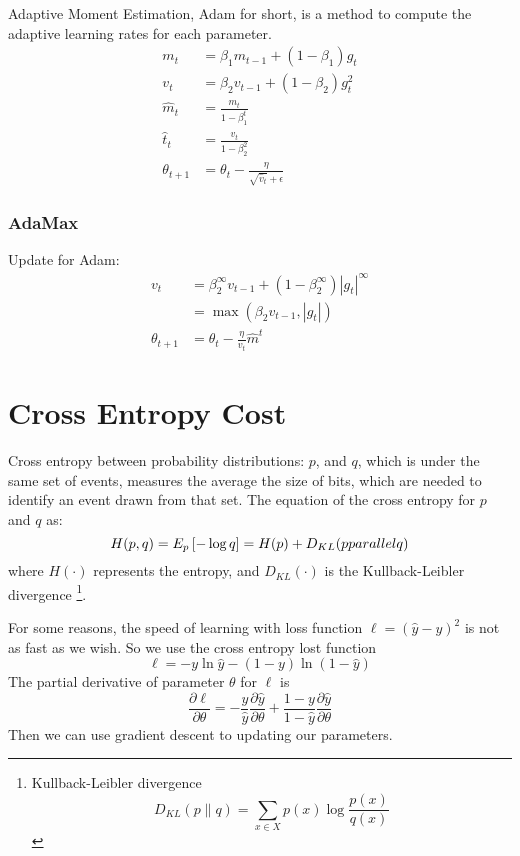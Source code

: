 \documentclass{article}
\begin{document}
Adaptive Moment Estimation, Adam for short, is a method to compute the adaptive learning rates for each parameter.
\begin{align*}
m_t &= \beta_1m_{t-1}+(1-\beta_1)g_t \\
v_t &= \beta_2v_{t-1} + (1-\beta_2)g_t^2 \\
\hat{m}_t &= \frac{m_t}{1-\beta^t_1} \\
\hat{t}_t &= \frac{v_t}{1-\beta_2^2} \\
\theta_{t+1} &= \theta_t - \frac{\eta}{\sqrt{\hat{v}_t}+\epsilon}
\end{align*}

\subsubsection{AdaMax}
\label{sec:gd:gdoa:adamax}

Update for Adam:
\begin{align*}
v_t &=\beta^\infty_2v_{t-1}+(1-\beta_2^{\infty})|g_t|^\infty \\
	  &= \max(\beta_2v_{t-1},|g_t|) \\
\theta_{t+1} &= \theta_t - \frac{\eta}{v_t}\hat{m}^t
\end{align*}




\section{Cross Entropy Cost}
\label{sec:cec}

Cross entropy between probability distributions: $p$, and $q$, which is under the same set of events, measures the average
the size of bits, which are needed to identify an event drawn from that set.
The equation of the cross entropy for $p$ and $q$ as:
\[
H(p,q) = E_p\left[-\log{q}\right] = H(p) + D_{KL}(p\\parallel q)
\] 
where $H(\cdot)$ represents the entropy, and $D_{KL}(\cdot)$ is the Kullback-Leibler divergence%
\footnote{ Kullback-Leibler divergence
	\[
	D_{KL}(p\parallel q) = \sum\limits_{x \in X}p(x)\log\frac{p(x)}{q(x)}
	\]
}.

For some reasons, the speed of learning with loss function $\ell = (\hat{y}-y)^2$ is not as fast as we wish.
So we use the cross entropy lost function
\[
\ell = - y\ln{\hat{y}}-(1-y)\ln{(1-\hat{y})}
\]
The partial derivative of parameter $\theta$ for $\ell$ is 
\[
\frac{\partial \ell}{\partial \theta} = - \frac{y}{\hat{y}}\frac{\partial\hat{y}}{\partial\theta} + \frac{1-y}{1-\hat{y}}\frac{\partial\hat{y}}{\partial \theta}
\] 
Then we can use gradient descent to updating our parameters.
\end{document}
